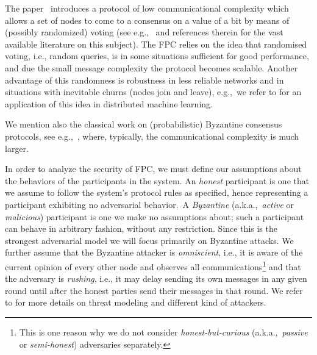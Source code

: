 \documentclass[../main.tex]{subfiles}
\begin{document}
\label{sec:fpc}

The paper~\cite{popov2019} introduces a protocol 
of low communicational complexity
which allows a set of nodes to come to a 
consensus on a value of a bit by means 
of (possibly randomized) voting
(see e.g.,~\cite{Becchetti2016,cooper2014,cooper2015, elsasser2016,fanti2019,mallmann2017}
and references therein for the vast available literature 
on this subject). The FPC relies on the idea that randomised voting, i.e., random queries, is in some situations sufficient for good performance, and due the small message complexity the protocol becomes scalable. Another advantage of this randomness is robustness in less reliable networks and in situations with inevitable churns (nodes join and leave), e.g.,~we refer to \cite{wang2017probabilistic} for an application of this idea in distributed machine learning. 

We mention also the classical work on (probabilistic)
Byzantine consensus protocols,
see e.g.,~\cite{AguTou12, Ben83, Bra87, CasLis02, 
FelMic89, FriMosRay04, Rab83}, where,
typically, the communicational complexity is much larger.

In order to  analyze  the security of FPC, we must define our assumptions about the behaviors of the participants in the system. An \emph{honest} participant is one that we assume to follow the system’s protocol rules as specified, hence representing a participant exhibiting no adversarial behavior.~A \emph{Byzantine} (a.k.a.,~\emph{active} or \emph{malicious}) participant is one we make no assumptions about; such a participant can behave in arbitrary fashion, without any restriction. Since this is the strongest adversarial model we will focus primarily on Byzantine attacks. We further assume that the Byzantine attacker is \emph{omniscient}, i.e.,  it is aware of the current opinion of every other node and observes all communications\footnote{This is one reason why we do not consider \emph{honest-but-curious}  (a.k.a.,~\emph{passive} or \emph{semi-honest}) adversaries separately.}
and that the adversary is \emph{rushing}, i.e., it may delay sending its own messages in any given round until after the honest parties send their messages in that round. %
We refer to \cite{Ford2019} for more details on threat modeling and different kind of attackers. 
\end{document}
